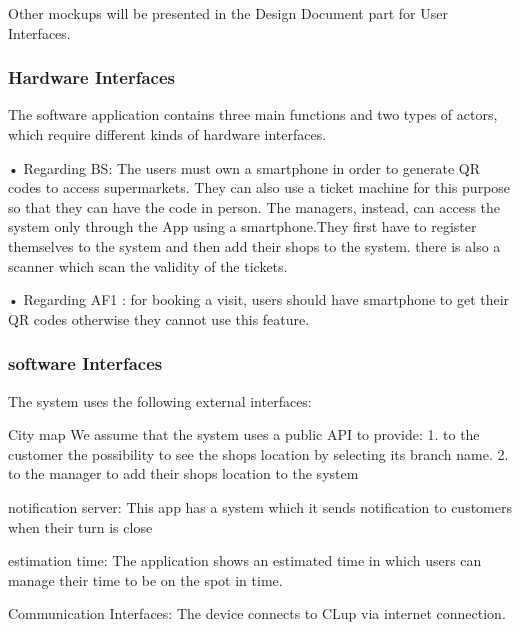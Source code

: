 Other mockups will be presented in the Design Document part for User Interfaces.
\subsubsection{Hardware Interfaces}
The software application contains three main functions and two types of actors, which require different
kinds of hardware interfaces.

• Regarding BS:
The users must own a smartphone in order to generate QR codes to access supermarkets. They
can also use a ticket machine for this purpose so that they can have the code in person.
The managers, instead, can access the system only through the App using a smartphone.They first have to register themselves to the system and then add their shops to the system. there is also a scanner which scan the validity of the tickets.

• Regarding AF1 : for booking a visit, users should have smartphone to get their QR codes otherwise they cannot use this feature.
\subsubsection{software Interfaces}
The system uses the following external interfaces:

City map
We assume that the system uses a public API to provide:
1. to the customer the possibility to see the shops location by selecting its branch name.
2. to the manager to add their shops location to the system

notification server:
This app has a system which it sends notification to customers when their turn is close 

estimation time:
The application shows an estimated time in which users can manage their time to be on the spot in time.

Communication Interfaces:
The device connects to CLup via internet connection.